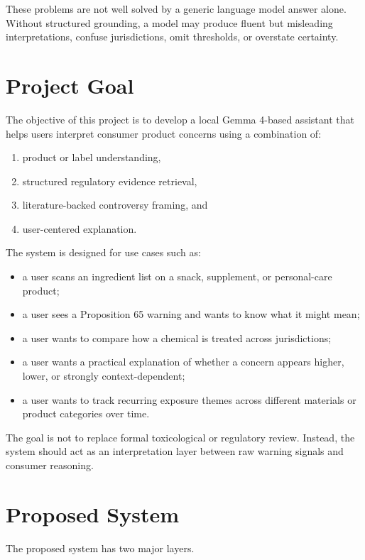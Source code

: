 \documentclass[11pt]{article}
\begin{document}
These problems are not well solved by a generic language model answer alone. Without structured grounding, a model may produce fluent but misleading interpretations, confuse jurisdictions, omit thresholds, or overstate certainty.

\section{Project Goal}

The objective of this project is to develop a local Gemma 4-based assistant that helps users interpret consumer product concerns using a combination of:

\begin{enumerate}[leftmargin=1.5em]
\item product or label understanding,
\item structured regulatory evidence retrieval,
\item literature-backed controversy framing, and
\item user-centered explanation.
\end{enumerate}

The system is designed for use cases such as:

\begin{itemize}[leftmargin=1.5em]
\item a user scans an ingredient list on a snack, supplement, or personal-care product;
\item a user sees a Proposition 65 warning and wants to know what it might mean;
\item a user wants to compare how a chemical is treated across jurisdictions;
\item a user wants a practical explanation of whether a concern appears higher, lower, or strongly context-dependent;
\item a user wants to track recurring exposure themes across different materials or product categories over time.
\end{itemize}

The goal is not to replace formal toxicological or regulatory review. Instead, the system should act as an interpretation layer between raw warning signals and consumer reasoning.

\section{Proposed System}

The proposed system has two major layers.
\end{document}
